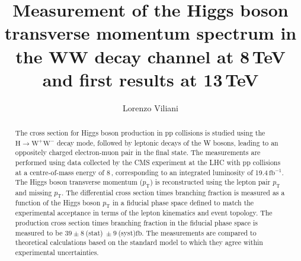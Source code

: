 \documentclass[english,12pt,booktabs,hyperref,titling,twoside,openright]{hepthesis}
\let\oldTeV\TeV
\renewcommand{\TeV}{\,\oldTeV \xspace}
\newcommand{\fb}{\ensuremath{\mathrm{fb}}\xspace}
\newcommand{\ifb}{\ensuremath{\,\mathrm{fb^{-1}}}\xspace}
\newcommand{\pt}{\ensuremath{p_\mathrm{T}}\xspace}
\begin{document}

\begin{frontmatter}

\title{Measurement of the Higgs boson transverse momentum spectrum in the WW decay channel at 8\,TeV and first results at 13\,TeV}
\author{Lorenzo Viliani}


\begin{abstract}
The cross section for Higgs boson production in pp collisions is studied using the $\mathrm{H} \to \mathrm{W}^+ \mathrm{W}^-$  decay mode, followed by leptonic decays of the W bosons, leading to an oppositely charged electron-muon pair in the final state. 
The measurements are performed using data collected by the CMS experiment at the LHC with pp collisions at a centre-of-mass energy of 8\TeV, corresponding to an integrated luminosity of 19.4\ifb.
The Higgs boson transverse momentum (\pt) is reconstructed using the lepton pair \pt and missing \pt. The differential cross section times branching fraction is measured as a function of the Higgs boson \pt in a fiducial phase space defined to match the experimental acceptance in terms of the lepton kinematics and event topology. The production cross section times branching fraction in the fiducial phase space is measured to be $39 \pm 8~$(stat)$~\pm 9~$(syst)\fb. The measurements are compared to theoretical calculations based on the standard model to which they agree within experimental uncertainties.
\end{abstract}

\cleardoublepage
\pagestyle{fancy}
\fancyhead{}
\fancyfoot{}
\fancyhead[LO]{\slshape \footnotesize \rightmark}
\fancyhead[RE]{\slshape \footnotesize \leftmark}
\fancyhead[RO]{\thepage}
\fancyhead[LE]{\thepage}
\tableofcontents
\cleardoublepage

\end{frontmatter}

\begin{mainmatter}








\clearpage
\appendix

\end{mainmatter}

\begin{backmatter}

\clearpage\thispagestyle{empty}\cleardoublepage
{}
\printbibliography
\clearpage\thispagestyle{empty}\cleardoublepage

\end{backmatter}
\end{document}
